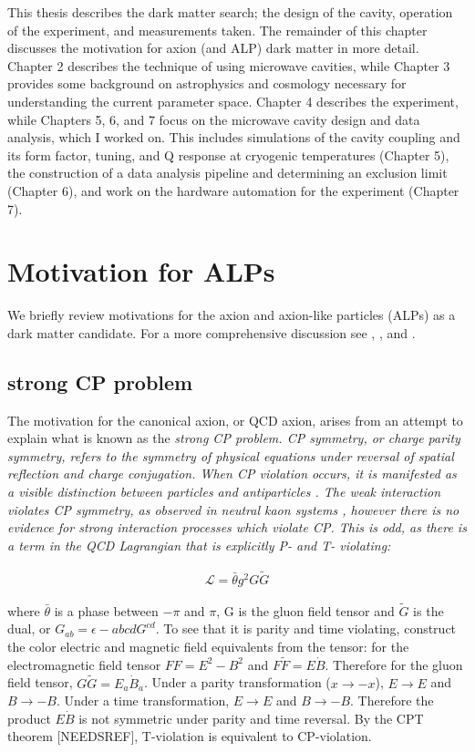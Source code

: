\documentclass[12pt,twosides]{book}
\begin{document}
This thesis describes the dark matter search; the design of the cavity, operation of the experiment, and measurements taken. The remainder of this chapter discusses the motivation for axion (and ALP) dark matter in more detail. Chapter 2 describes the technique of using microwave cavities, while Chapter 3 provides some background on astrophysics and cosmology necessary for understanding the current parameter space. Chapter 4 describes the experiment, while Chapters 5, 6, and 7 focus on the microwave cavity design and data analysis, which I worked on. This includes simulations of the cavity coupling and its form factor, tuning, and Q response at cryogenic temperatures (Chapter 5), the construction of a data analysis pipeline and determining an exclusion limit (Chapter 6), and work on the hardware automation for the experiment (Chapter 7).

\section{Motivation for ALPs}

We briefly review motivations for the axion and axion-like particles (ALPs) as a dark matter candidate. For a more comprehensive discussion see \cite{hewett12}, \cite{arias12}, and \cite{kim87}. 

\subsection{strong CP problem}

The motivation for the canonical axion, or QCD axion, arises from an attempt to explain what is known as the \it{strong CP problem}. CP symmetry, or charge parity symmetry, refers to the symmetry of physical equations under reversal of spatial reflection and charge conjugation.  When CP violation occurs,  it is manifested as a visible distinction between particles and antiparticles \cite{gottfried86}. The weak interaction violates CP symmetry, as observed in neutral kaon systems , however there is no evidence for strong interaction processes which violate CP. This is odd, as there is a term in the QCD Lagrangian that is explicitly P- and T- violating:

\begin{align*}
\mathcal{L} = \bar \theta g^2 G \tilde G
\end{align*}

where $\bar \theta$ is a phase between $-\pi$ and $\pi$, G is the gluon field tensor and $\tilde G$ is the dual, or $G_{ab} = \epsilon-{abcd} G^{cd}$. To see that it is parity and time violating, construct the color electric and magnetic field equivalents from the tensor: for the electromagnetic field tensor $FF = E^2 -B^2$ and $F\tilde F = E\dot B$. Therefore for the gluon field tensor, $G\tilde G = E_a \dot B_a$. Under a parity transformation ($x \rightarrow -x$), $E \rightarrow E$ and $B \rightarrow -B$. Under a time transformation, $
E \rightarrow E$ and $B \rightarrow -B$.  Therefore the product $E\dot B$ is not symmetric under parity and time reversal. By the CPT theorem [NEEDSREF], T-violation is equivalent to CP-violation.
\end{document}
